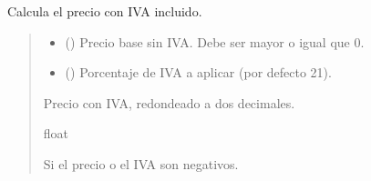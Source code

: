 \documentclass[letterpaper,10pt,spanish]{sphinxmanual}
\begin{document}
\begin{fulllineitems}
\label{\detokenize{calculadora:calculadora.calcular_con_iva}}
\pysigstartsignatures
\pysiglinewithargsret
{}
{\sphinxparamcomma {}}
{}
\pysigstopsignatures
\sphinxAtStartPar
Calcula el precio con IVA incluido.
\begin{quote}\begin{description}
\begin{itemize}
\item {} 
\sphinxAtStartPar
{} () \textendash{} Precio base sin IVA. Debe ser mayor o igual que 0.

\item {} 
\sphinxAtStartPar
{} () \textendash{} Porcentaje de IVA a aplicar (por defecto 21).

\end{itemize}

\sphinxAtStartPar
Precio con IVA, redondeado a dos decimales.

\sphinxAtStartPar
float

\sphinxAtStartPar
{} \textendash{} Si el precio o el IVA son negativos.

\end{description}\end{quote}

\end{fulllineitems}

\end{document}
